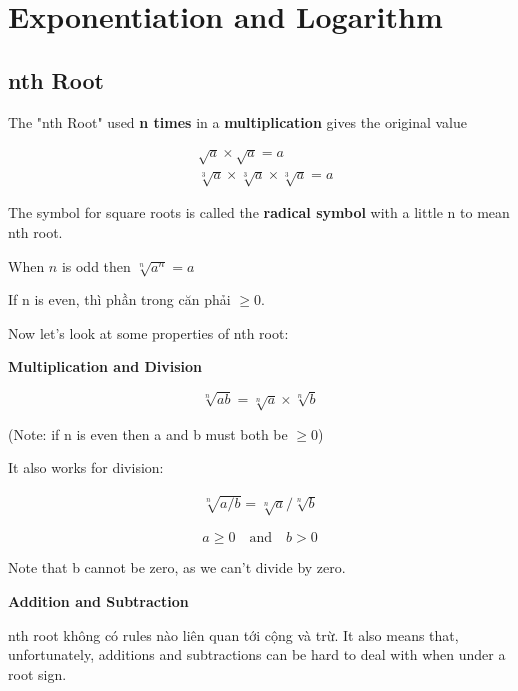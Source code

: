 \chapter{Exponentiation and Logarithm}

\section{nth Root}

The "nth Root" used \textbf{n times} in a \textbf{multiplication} gives the original value

\[
  \begin{aligned}
    &\sqrt{a} \times \sqrt{a} = a\\
    &\sqrt[3]{a} \times \sqrt[3]{a} \times \sqrt[3]{a} = a
  \end{aligned}
\]

The symbol for square roots \q{\(\sqrt{}\)} is called the \textbf{radical symbol} with a little n to mean nth root.

When \(n\) is odd then \(\sqrt[n]{a^{n}}=a\)

If n is even, thì phần trong căn phải \(\geq 0\).

\vspace{10 mm}

Now let's look at some properties of nth root:

\textbf{Multiplication and Division}

\begin{equation}
  \sqrt[n]{ab}=\sqrt[n]{a} \times \sqrt[n]{b}
\end{equation}

(Note: if n is even then a and b must both be \(\geq 0\))

It also works for division:

\begin{equation}
  \begin{aligned}
    \sqrt[n]{a/b}=\sqrt[n]{a}/\sqrt[n]{b}
  \end{aligned}
\end{equation}

\[a \geq 0 \quad \text{and} \quad b > 0\]

Note that b cannot be zero, as we can't divide by zero.

\textbf{Addition and Subtraction}

nth root không có rules nào liên quan tới cộng và trừ. It also means that, unfortunately, additions and subtractions can be hard to deal with when under a root sign.

